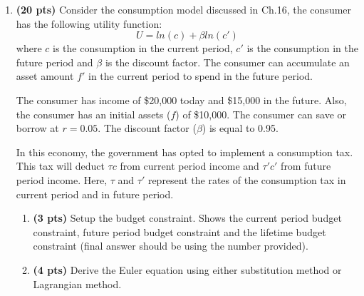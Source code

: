 \documentclass[addpoints,12pt,answers]{exam}
\begin{document}
\begin{enumerate}[label=\textbf{\arabic*.}, itemsep=15pt]
\begin{enumerate}[label=(\alph*)]
			The Euler equation is:
			\[\frac{c'}{c} = (\beta) (1+r)\]
			
			Note that the Euler equation is the same, which is a property of the utility function specific in this question.
			
			Plug it into the budget constraint:
			\[c+\frac{(\beta) (1+r)}{1+r} = \bar{X}\]
			\[c_{tax} = \frac{\bar{X}}{1+\beta} = \frac{27877.45}{1.95} = 14296.13\]
			
			\[c'_{tax} = (1+r) \frac{\beta}{1+\beta} \bar{X} = 13852.95\]
			
			\item Comparing $c_{tax}$ and $c'_{tax}$ to $c$ and $c'$, the implementation of income tax by the government results in lower consumption. This is due to the fact that consumers experience a reduction in income when the government imposes an income tax, leading to a negative income effect.
		\end{enumerate}

		\clearpage
		\item \textbf{(20  pts)}\label{P2} 	Consider the consumption model discussed in Ch.16, the consumer has the following utility function:
		\[U = ln(c) + \beta ln(c')\]
		where $c$ is the consumption in the current period, $c'$ is the consumption in the future period and $\beta$ is the discount factor. The consumer can accumulate an asset amount \( f' \) in the current period to spend in the future period.
		
		The consumer has income of \$20,000 today and \$15,000 in the future. Also, the consumer has an initial assets ($f$) of \$10,000. The consumer can save or borrow at $r= 0.05$. The discount factor ($\beta$) is equal to 0.95.
		
		In this economy, the government has opted to implement a consumption tax. This tax will deduct $\tau c$ from current period income and $\tau' c'$ from future period income. Here, $\tau$ and $\tau'$ represent the rates of the consumption tax in current period and in future period.
		
		\begin{enumerate}[label=(\alph*)]
			\item \textbf{(3  pts)}  Setup the budget constraint. Shows the current period budget constraint, future period budget constraint and the lifetime budget constraint (final answer should be using the number provided).
			
			\item \textbf{(4  pts)} Derive the Euler equation using either substitution method or Lagrangian method. 
			

\end{enumerate}
\end{enumerate}
\end{document}
